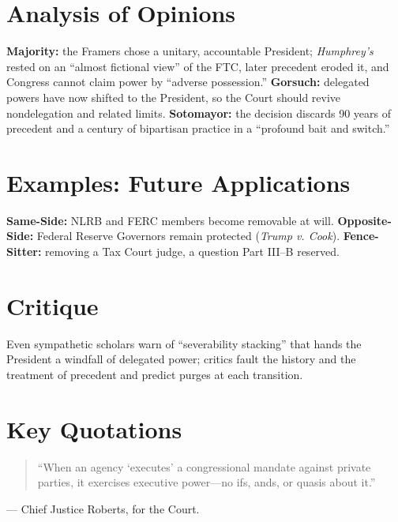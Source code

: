 \documentclass[12pt]{article}
\begin{document}
\section{Analysis of Opinions}
\textbf{Majority:} the Framers chose a unitary, accountable President; \textit{Humphrey's} rested on an ``almost fictional view'' of the FTC, later precedent eroded it, and Congress cannot claim power by ``adverse possession.'' \textbf{Gorsuch:} delegated powers have now shifted to the President, so the Court should revive nondelegation and related limits. \textbf{Sotomayor:} the decision discards 90 years of precedent and a century of bipartisan practice in a ``profound bait and switch.''

\section{Examples: Future Applications}
\textbf{Same-Side:} NLRB and FERC members become removable at will. \textbf{Opposite-Side:} Federal Reserve Governors remain protected (\textit{Trump v. Cook}). \textbf{Fence-Sitter:} removing a Tax Court judge, a question Part III--B reserved.

\section{Critique}
Even sympathetic scholars warn of ``severability stacking'' that hands the President a windfall of delegated power; critics fault the history and the treatment of precedent and predict purges at each transition.

\section{Key Quotations}
\begin{quote}
``When an agency `executes' a congressional mandate against private parties, it exercises executive power---no ifs, ands, or quasis about it.''
\end{quote}
\noindent --- Chief Justice Roberts, for the Court.
\end{document}
